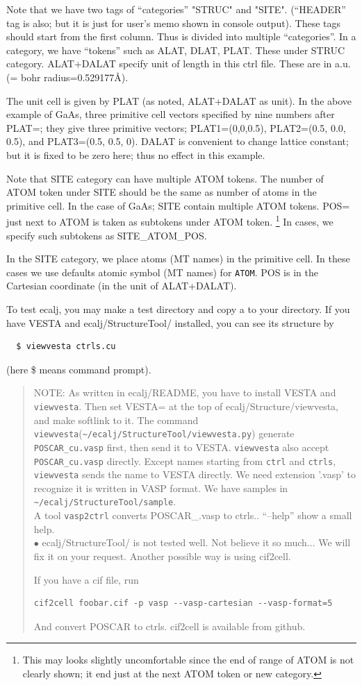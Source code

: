 Note that we have two tags of ``categories'' "STRUC" and "SITE". 
(``HEADER'' tag is also; but it is just for user's memo shown in console output).
These tags should start from the first column. 
Thus \ctrls is divided into multiple ``categories''.
In a category, we have ``tokens'' such as ALAT, DLAT, PLAT. 
These under STRUC category. 
ALAT+DALAT specify unit of length in this ctrl file.
These are in a.u. (= bohr radius=0.529177\AA). 

The unit cell is given by PLAT (as noted, ALAT+DALAT as unit).
In the above example of GaAs, three primitive cell vectors specified by nine
numbers after PLAT=; they give three primitive vectors;
PLAT1=(0,0,0.5), PLAT2=(0.5, 0.0, 0.5), and PLAT3=(0.5, 0.5, 0). 
DALAT is convenient to change lattice constant; but it is fixed to be
zero here; thus no effect in this example.

Note that SITE category can have multiple ATOM tokens. The number of
ATOM token under SITE should be the same as number of atoms in the primitive cell.
In the case of GaAs; SITE contain multiple ATOM tokens.
POS= just next to ATOM is taken as subtokens under ATOM token. 
\footnote{This may looks slightly uncomfortable since the end of range of ATOM
 is not clearly shown; it end just at the next ATOM token or new category.}
In cases, we specify such subtokens as SITE\_ATOM\_POS.

In the SITE category, we place atoms (MT names) in the primitive cell.
In these cases we use defaults atomic symbol (MT names) for \verb+ATOM+.
POS is in the Cartesian coordinate (in the unit of ALAT+DALAT).

To test ecalj, you may make a test directory and copy a \ctrls to your directory.
If you have VESTA and ecalj/StructureTool/ installed, you can see its structure by 
\begin{verbatim}
  $ viewvesta ctrls.cu
\end{verbatim}
(here \$ means command prompt).
\begin{quote}
NOTE: As written in ecalj/README, you have to install VESTA and \verb+viewvesta+. 
Then set VESTA= at the top of ecalj/Structure/viewvesta, and make softlink to it.
The command \verb+viewvesta+(\verb+~/ecalj/StructureTool/viewvesta.py+)
generate \verb+POSCAR_cu.vasp+ first, then send it to VESTA.
\verb+viewvesta+ also accept \verb+POSCAR_cu.vasp+ directly.
Except names starting from \verb+ctrl+ and \verb+ctrls+,
\verb+viewvesta+ sends the name to VESTA directly. 
We need extension '.vasp' to recognize it is written in VASP format.
We have samples in \verb+~/ecalj/StructureTool/sample+.\\
A tool \verb+vasp2ctrl+ converts POSCAR\_\*.vasp to ctrls.\*.
``--help'' show a small help. \\
$\bullet$ ecalj/StructureTool/ is not tested well. Not believe it so
much... We will fix it on your request.
Another possible way is using cif2cell.

If you have a cif file, run
\begin{verbatim}
cif2cell foobar.cif -p vasp --vasp-cartesian --vasp-format=5
\end{verbatim}
And convert POSCAR to ctrls. cif2cell is available from github.
\end{quote}

